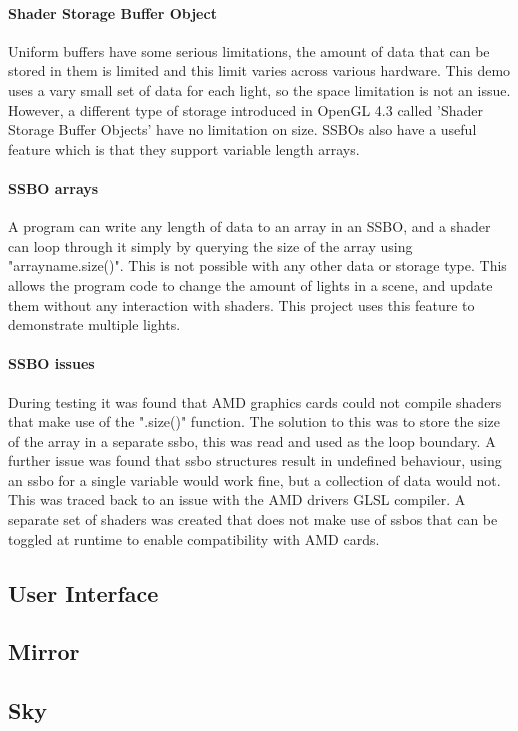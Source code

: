 \documentclass[conference]{acmsiggraph}
\begin{document}
\paragraph{Shader Storage Buffer Object}
Uniform buffers have some serious limitations, the amount of data that can be stored in them is limited and this limit varies across various hardware. This demo uses a vary small set of data for each light, so the space limitation is not an issue. However, a different type of storage introduced in OpenGL 4.3 called 'Shader Storage Buffer Objects' have no limitation on size. SSBOs also have a useful feature which is that they support variable length arrays.

\paragraph{SSBO arrays}
A program can write any length of data to an array in an SSBO, and a shader can loop through it simply by querying the size of the array using "arrayname.size()". This is not possible with any other data or storage type. This allows the program code to change the amount of lights in a scene, and update them without any interaction with shaders. This project uses this feature to demonstrate multiple lights.

\paragraph{SSBO issues}
During testing it was found that AMD graphics cards could not compile shaders that make use of the ".size()" function. The solution to this was to store the size of the array in a separate ssbo, this was read and used as the loop boundary. A further issue was found that ssbo structures result in undefined behaviour, using an ssbo for a single variable would work fine, but a collection of data would not. This was traced back to an issue with the AMD drivers GLSL compiler. A separate set of shaders was created that does not make use of ssbos that can be toggled at runtime to enable compatibility with AMD cards.


\subsection{User Interface}
\subsection{Mirror}
\subsection{Sky}
\end{document}
